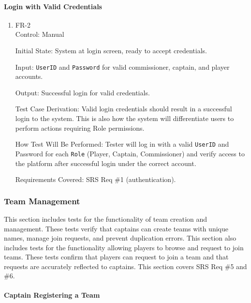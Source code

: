 \documentclass[12pt, titlepage]{article}
\begin{document}
\paragraph{Login with Valid Credentials}

\begin{enumerate}

  \item{FR-2\\}
        Control: Manual

        Initial State: System at login screen, ready to accept credentials.

        Input: \texttt{UserID} and \texttt{Password} for valid commissioner, captain, and player accounts.

        Output: Successful login for valid credentials.

        Test Case Derivation: Valid login credentials should result in a successful login to the system. This is also how the system will differentiate users to perform actions requiring Role permissions.

        How Test Will Be Performed: Tester will log in with a valid \texttt{UserID} and Password for each \texttt{Role} (Player, Captain, Commissioner) and verify access to the platform after successful login under the correct account.

        Requirements Covered: SRS Req \#1 (authentication).
\end{enumerate}

\subsubsection{Team Management}

This section includes tests for the functionality of team creation and management. These tests verify that captains can create teams with unique names, manage join requests, and prevent duplication errors. This section also includes tests for the functionality allowing players to browse and request to join teams. These tests confirm that players can request to join a team and that requests are accurately reflected to captains. This section covers SRS Req \#5 and \#6.

\paragraph{Captain Registering a Team}
\end{document}
